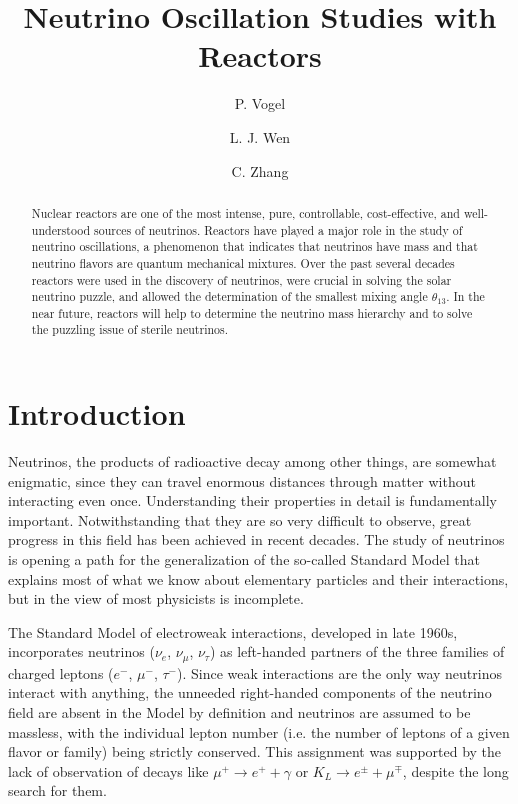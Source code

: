 \documentclass[aps,twocolumn,preprintnumbers,amsmath,superscriptaddress,amssymb,floats,nofootinbib]{revtex4-1}
\begin{document}
\title{Neutrino Oscillation Studies with Reactors}
\author{P. Vogel}
\author{L. J. Wen}
\author{C. Zhang}


\begin{abstract}
Nuclear reactors are one of the most intense, pure, controllable, cost-effective, and well-understood sources of neutrinos. Reactors have played a major
role in the study of neutrino oscillations, a phenomenon that indicates that neutrinos have mass and that neutrino flavors are quantum mechanical mixtures. Over the past several decades reactors were used in the discovery of neutrinos, were crucial in solving the solar neutrino puzzle, and allowed the determination of the smallest mixing angle $\theta_{13}$. In the near future, reactors will help to determine the neutrino mass hierarchy and to solve the puzzling issue of sterile neutrinos.
\end{abstract}

\maketitle
\thispagestyle{plain}

\section{Introduction}
\label{sec:intro}
Neutrinos, the products of  radioactive decay among other things, are somewhat enigmatic, since they can travel enormous distances through matter without interacting even once.
Understanding their properties in detail is fundamentally important. Notwithstanding that they are so very difficult to observe, great progress in this field has been achieved in recent decades.
The study of neutrinos is opening a path for the generalization of the so-called Standard Model that explains most of what we know
about elementary particles and their interactions, but in the view of most physicists is incomplete.

The Standard Model of electroweak interactions,
developed in late 1960s, incorporates neutrinos ($\nu_e$, $\nu_\mu$, $\nu_\tau$) as left-handed partners of the three families of charged leptons ($e^-$, $\mu^-$, $\tau^-$).
Since weak interactions are the only way neutrinos interact with anything, the unneeded right-handed components of the neutrino field are absent
in the Model by definition and neutrinos are assumed to be massless, with the individual lepton number (i.e. the number of leptons of a
given flavor or family) being strictly conserved.
This assignment was supported by the lack of observation of decays like
$\mu^+ \rightarrow e^+ + \gamma$ or $K_L \rightarrow e^{\pm} + \mu^{\mp}$,
despite the long search for them.
\end{document}
